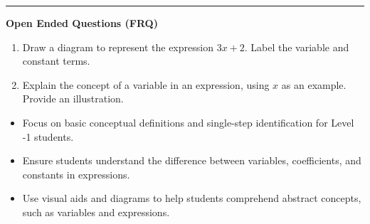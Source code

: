 \documentclass[10pt]{article}
\begin{document}
\vspace{-0.2cm}
\hrule
\vspace{0.2cm}
\textbf{\small Open Ended Questions (FRQ)}
\begin{enumerate}[label=\textbf{Q\arabic*.}, start=9, itemsep=5pt, topsep=0pt]

  \item \small Draw a diagram to represent the expression $3x + 2$. Label the variable and constant terms. \vspace{2cm}

  \item \small Explain the concept of a variable in an expression, using $x$ as an example. Provide an illustration. \vspace{2cm}

\end{enumerate}

\vfill

\begin{tcolorbox}[colback=blue!5, colframe=mainblue!50, title=\small \textbf{Chef's Tips}, fonttitle=\bfseries, bottom=1mm]
\begin{itemize}[noitemsep, topsep=2pt, leftmargin=0.5cm]
  \item \scriptsize Focus on basic conceptual definitions and single-step identification for Level -1 students.\item \scriptsize Ensure students understand the difference between variables, coefficients, and constants in expressions.\item \scriptsize Use visual aids and diagrams to help students comprehend abstract concepts, such as variables and expressions.
\end{itemize}
\end{tcolorbox}
\end{document}

